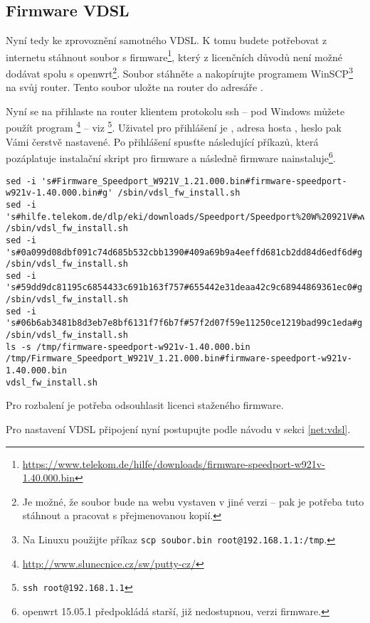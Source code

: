 \subsection{Firmware VDSL}
\label{firstboot:vdslfw}
Nyní tedy ke zprovoznění samotného VDSL.
K tomu budete
potřebovat z internetu stáhnout soubor s firmware\footnote{
\url{https://www.telekom.de/hilfe/downloads/firmware-speedport-w921v-1.40.000.bin}},
který z licenčních důvodů není možné dodávat spolu s \gls{openwrt}\footnote{
Je možné, že soubor bude na webu vystaven v jiné verzi -- pak je potřeba tuto
stáhnout a pracovat s přejmenovanou kopií.
}. Soubor stáhněte a nakopírujte programem WinSCP\footnote{Na Linuxu použijte příkaz
{\texttt{scp soubor.bin root@192.168.1.1:/tmp}}.} na svůj router.
Tento soubor uložte na router do adresáře .

Nyní se na přihlaste na router klientem protokolu \gls{ssh} -- pod Windows můžete
použít program \footnote{\url{http://www.slunecnice.cz/sw/putty-cz/}} -- viz \footnote{\texttt{ssh root@192.168.1.1}}.
Uživatel pro přihlášení
je , adresa hosta , heslo pak Vámi čerstvě nastavené.
Po přihlášení spusťte následující příkazů, která pozáplatuje instalační skript
pro firmware a následně firmware nainstaluje\footnote{\gls{openwrt} 15.05.1
předpokládá starší, již nedostupnou, verzi firmware.}.
\begin{verbatim}
sed -i 's#Firmware_Speedport_W921V_1.21.000.bin#firmware-speedport-w921v-1.40.000.bin#g' /sbin/vdsl_fw_install.sh
sed -i 's#hilfe.telekom.de/dlp/eki/downloads/Speedport/Speedport%20W%20921V#www.telekom.de/hilfe/downloads#g' /sbin/vdsl_fw_install.sh
sed -i 's#0a099d08dbf091c74d685b532cbb1390#409a69b9a4eeffd681cb2dd84d6edf6d#g' /sbin/vdsl_fw_install.sh
sed -i 's#59dd9dc81195c6854433c691b163f757#655442e31deaa42c9c68944869361ec0#g' /sbin/vdsl_fw_install.sh
sed -i 's#06b6ab3481b8d3eb7e8bf6131f7f6b7f#57f2d07f59e11250ce1219bad99c1eda#g' /sbin/vdsl_fw_install.sh
ls -s /tmp/firmware-speedport-w921v-1.40.000.bin /tmp/Firmware_Speedport_W921V_1.21.000.bin#firmware-speedport-w921v-1.40.000.bin
vdsl_fw_install.sh
\end{verbatim}
Pro rozbalení je potřeba odsouhlasit licenci staženého firmware.

Pro nastavení VDSL připojení nyní postupujte podle návodu v sekci \ref{net:vdsl}.
